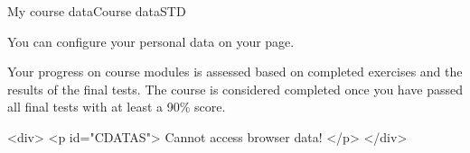\begin{MXContent}{My course data}{Course data}{STD}
\MGlobalDataTag
{}

You can configure your personal data on your  page.

Your progress on course modules is assessed based on completed exercises and the results of the final tests.
The course is considered completed once you have passed all final tests with at least a 90\% score.

\begin{html}
<div>
<p id="CDATAS">
Cannot access browser data!
</p>
</div>
\end{html}


\end{MXContent}



